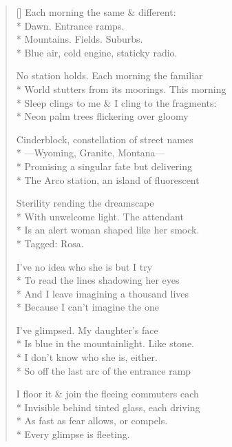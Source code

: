 \label{ch:can_you_imagine}
\settowidth{\versewidth}{Sleep clings to me \& I cling to the fragments:}
\begin{verse}[\versewidth]
Each morning the same \& different:\\*
Dawn. Entrance ramps.\\*
Mountains. Fields. Suburbs.\\*
Blue air, cold engine, staticky radio.

No station holds. Each morning the familiar\\*
World stutters from its moorings.  This morning\\*
Sleep clings to me \& I cling to the fragments:\\*
Neon palm trees flickering over gloomy

Cinderblock, constellation of street names\\*
---Wyoming, Granite, Montana---\\*
Promising a singular fate but delivering\\*
The Arco station, an island of fluorescent 

Sterility rending the dreamscape\\*
With unwelcome light.  The attendant\\*
Is an alert woman shaped like her smock.\\*
Tagged: Rosa.

I've no idea who she is but I try\\*
To read the lines shadowing her eyes\\*
And I leave imagining a thousand lives\\*
Because I can't imagine the one

I've glimpsed.  My daughter's face\\*
Is blue in the mountainlight.  Like stone.\\*
I don't know who she is, either.\\*
So off the last arc of the entrance ramp

I floor it \& join the fleeing commuters each\\*
Invisible behind tinted glass, each driving\\*
As fast as fear allows, or compels.\\*
Every glimpse is fleeting.
\end{verse}
